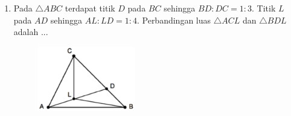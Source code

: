 \documentclass[11pt]{scrartcl}
\begin{document}
\begin{enumerate}
\vspace{6cm}\item Pada $ \triangle ABC $ terdapat titik $ D $ pada $ BC $ sehingga $ BD : DC = 1 : 3 $. Titik $ L $ pada $ AD $ sehingga $ AL : LD = 1 : 4 $. Perbandingan luas $ \triangle ACL $ dan $ \triangle BDL $ adalah ...
\begin{figure}[h]
\centering
\includegraphics[width=0.4\textwidth]{StarGen/0Figure/area-ratio-triangle-ald.png}
\end{figure}

\end{enumerate}
\end{document}
